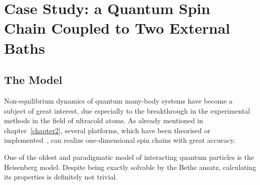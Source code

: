 \chapter{Case Study: a Quantum Spin Chain Coupled to Two External Baths}
\label{chapter_caseStudy}

\section{The Model}
\label{sec:model}
Non-equilibrium dynamics of quantum many-body systems have become a subject of great interest, due especially to the breakthrough in the experimental methods in the field of ultracold atoms. As already mentioned in chapter~\ref{chapter2}, several platforms, which have been theorised or implemented~\cite{exp_spinChain}, can realize one-dimensional spin chains with great accuracy. 

One of the oldest and paradigmatic model of interacting quantum particles is the Heisenberg model. Despite being exactly solvable by the Bethe ansatz, calculating its properties is definitely not trivial.

